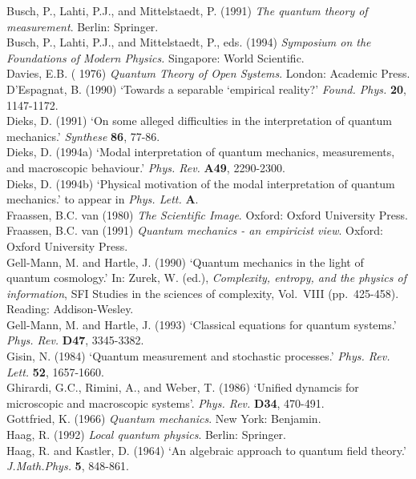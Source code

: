  Busch,  P., Lahti,  P.J., and Mittelstaedt,  P.  (1991) {\em The quantum
theory of measurement}.
 Berlin: Springer.\\
 Busch,  P., Lahti,  P.J., and Mittelstaedt,  P.,  eds.  (1994)
{\em Symposium on the Foundations of Modern Physics.}
Singapore: World Scientific.\\
Davies, E.B. ( 1976) {\em Quantum Theory of Open Systems}.
London: Academic Press. \\
  D'Espagnat, B. (1990) `Towards a separable `empirical reality?' {\em Found.
Phys.} {\bf 20},
1147-1172.\\
 Dieks, D. (1991) `On some alleged difficulties in the interpretation of
quantum mechanics.'
{\em Synthese} {\bf 86},  77-86.\\
  Dieks, D. (1994a) `Modal interpretation of quantum mechanics, measurements,
and macroscopic
behaviour.'  {\em Phys. Rev.} {\bf A49}, 2290-2300.\\
  Dieks, D. (1994b)  `Physical motivation of the modal interpretation of
quantum mechanics.' to
appear in {\em Phys. Lett.} {\bf A}.\\
   Fraassen, B.C. van (1980) {\em The Scientific Image}.  Oxford:
 Oxford University Press. \\
 Fraassen, B.C. van  (1991) {\em Quantum mechanics - an empiricist view}.
Oxford: Oxford
University Press.\\
Gell-Mann, M.  and  Hartle, J. (1990)  `Quantum mechanics in the light of
quantum
cosmology.' In: Zurek, W. (ed.), {\em Complexity, entropy, and the physics of
information}, SFI
Studies in the sciences of complexity, Vol.\ VIII (pp.\ 425-458).    Reading:
Addison-Wesley.\\
 Gell-Mann, M.  and  Hartle, J. (1993)  `Classical equations for quantum
systems.' {\em Phys. Rev.}
{\bf D47}, 3345-3382.\\
  Gisin, N. (1984)  `Quantum
measurement and stochastic processes.' {\em Phys. Rev. Lett.} {\bf 52},
1657-1660.\\
  Ghirardi, G.C.,  Rimini,  A., and Weber, T. (1986) `Unified dynamcis for
microscopic and
macroscopic systems'. {\em Phys. Rev.} {\bf D34},  470-491.\\
 Gottfried, K. (1966) {\em Quantum mechanics}.  New York: Benjamin.\\
 Haag, R. (1992) {\em Local quantum
physics}. Berlin: Springer.\\
 Haag, R. and  Kastler, D. (1964)  `An algebraic approach to
quantum field theory.'   {\em J.Math.Phys.} {\bf 5}, 848-861.\\
